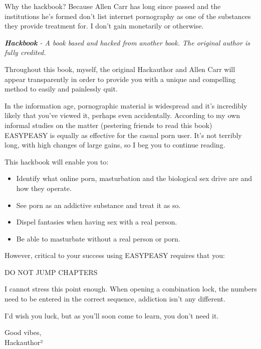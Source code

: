 \documentclass[easypeasy.tex]{subfiles}
\begin{document}
Why the hackbook? Because Allen Carr has long since passed and the institutions he's formed don't list internet pornography as one of the substances they provide treatment for. I don't gain monetarily or otherwise.

\textit{{\small \textbf{Hackbook} - A book based and hacked from another book. The original author is fully credited.}}

Throughout this book, myself, the original Hackauthor and Allen Carr will appear transparently in order to provide you with a unique and compelling method to easily and painlessly quit.

In the information age, pornographic material is widespread and it's incredibly likely that you've viewed it, perhaps even accidentally. According to my own informal studies on the matter (pestering friends to read this book) EASYPEASY is equally as effective for the casual porn user. It's not terribly long, with high changes of large gains, so I beg you to continue reading.

This hackbook will enable you to:
\begin{itemize}
  \item Identify what online porn, masturbation and the biological sex drive are and how they operate.
  \item See porn as an addictive substance and treat it as so.
  \item Dispel fantasies when having sex with a real person.
  \item Be able to masturbate without a real person or porn.
\end{itemize}

However, critical to your success using EASYPEASY requires that you:

{\huge DO NOT JUMP CHAPTERS}

I cannot stress this point enough. When opening a combination lock, the numbers need to be entered in the correct sequence, addiction isn't any different.

I'd wish you luck, but as you'll soon come to learn, you don't need it.

Good vibes, \\
Hackauthor²
\newpage
\tableofcontents
\end{document}

